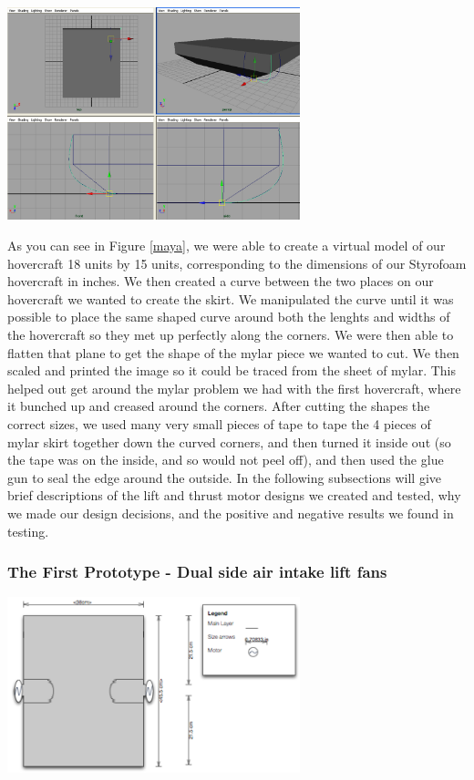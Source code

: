 \begin{center}
  \includegraphics[width=85mm]{imageSources/maya.png}
\end{center}
\label{maya}

As you can see in Figure \ref{maya}, we were able to create a virtual model of our hovercraft 18 units by 15 units, corresponding
to the dimensions of our Styrofoam hovercraft in inches. We then created a curve between the two places on our hovercraft we wanted to create the skirt.
We manipulated the curve until it was possible to place the same shaped curve around both the lenghts and widths of the hovercraft
so they met up perfectly along the corners. We were then able to flatten that plane to get the shape of the mylar piece we wanted
to cut. We then scaled and printed the image so it could be traced from the sheet of mylar. This helped out get around the mylar
problem we had with the first hovercraft, where
it bunched up and creased around the corners. After cutting the shapes the correct sizes, we used many very small pieces of tape
to tape the 4 pieces of mylar skirt together down the curved corners, and then turned it inside out (so the tape was on the inside,
and so would not peel off), and then used the glue gun to seal the edge around the outside. In the following subsections will give
brief descriptions of the lift and thrust motor designs we created and tested, why we made our design decisions, and the positive
and negative results we found in testing.

\subsubsection{The First Prototype - Dual side air intake lift fans}
\begin{center}
  \includegraphics[width=85mm]{imageSources/top2.png}
\end{center}
\label{top2}

